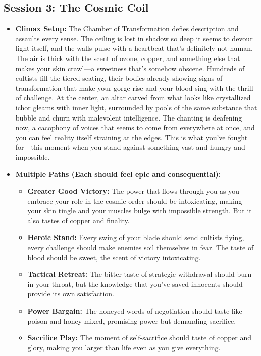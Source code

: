 \documentclass[11pt]{article}
\begin{document}
\subsection{Session 3: The Cosmic Coil}
\begin{itemize}
\item \textbf{Climax Setup:} The Chamber of Transformation defies description and assaults every sense. The ceiling is lost in shadow so deep it seems to devour light itself, and the walls pulse with a heartbeat that's definitely not human. The air is thick with the scent of ozone, copper, and something else that makes your skin crawl—a sweetness that's somehow obscene. Hundreds of cultists fill the tiered seating, their bodies already showing signs of transformation that make your gorge rise and your blood sing with the thrill of challenge. At the center, an altar carved from what looks like crystallized ichor gleams with inner light, surrounded by pools of the same substance that bubble and churn with malevolent intelligence. The chanting is deafening now, a cacophony of voices that seems to come from everywhere at once, and you can feel reality itself straining at the edges. This is what you've fought for—this moment when you stand against something vast and hungry and impossible.
\item \textbf{Multiple Paths (Each should feel epic and consequential):}
  \begin{itemize}
  \item \textbf{Greater Good Victory:} The power that flows through you as you embrace your role in the cosmic order should be intoxicating, making your skin tingle and your muscles bulge with impossible strength. But it also tastes of copper and finality.
  \item \textbf{Heroic Stand:} Every swing of your blade should send cultists flying, every challenge should make enemies soil themselves in fear. The taste of blood should be sweet, the scent of victory intoxicating.
  \item \textbf{Tactical Retreat:} The bitter taste of strategic withdrawal should burn in your throat, but the knowledge that you've saved innocents should provide its own satisfaction.
  \item \textbf{Power Bargain:} The honeyed words of negotiation should taste like poison and honey mixed, promising power but demanding sacrifice.
  \item \textbf{Sacrifice Play:} The moment of self-sacrifice should taste of copper and glory, making you larger than life even as you give everything.

\end{itemize}
\end{itemize}
\end{document}
